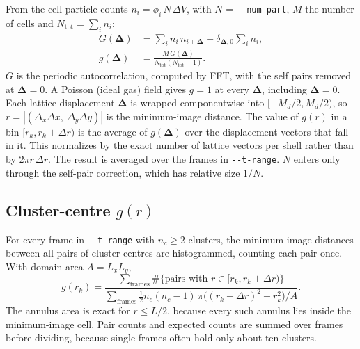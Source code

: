 \documentclass[11pt]{article}
\newcommand{\code}[1]{\texttt{#1}}
\begin{document}
From the cell particle counts $n_i = \phi_i\,N\,\Delta V$, with
$N$ = \code{-{}-num-part}, $M$ the number of cells and $N_{\mathrm{tot}} = \sum_i n_i$:
\begin{align}
  G(\boldsymbol{\Delta}) &= \sum_i n_i\,n_{i+\boldsymbol{\Delta}}
     - \delta_{\boldsymbol{\Delta},0}\sum_i n_i , \\
  g(\boldsymbol{\Delta}) &= \frac{M\,G(\boldsymbol{\Delta})}{N_{\mathrm{tot}}(N_{\mathrm{tot}}-1)} .
\end{align}
$G$ is the periodic autocorrelation, computed by FFT, with the self pairs
removed at $\boldsymbol{\Delta}=0$. A Poisson (ideal gas) field gives
$g = 1$ at every $\boldsymbol{\Delta}$, including $\boldsymbol{\Delta}=0$. Each
lattice displacement $\boldsymbol{\Delta}$ is wrapped componentwise into
$[-M_d/2, M_d/2)$, so $r = |(\Delta_x\Delta x,\ \Delta_y\Delta y)|$ is the
minimum-image distance. The value of $g(r)$ in a bin $[r_k, r_k+\Delta r)$ is
the average of $g(\boldsymbol{\Delta})$ over the displacement vectors that fall
in it. This normalizes by the exact number of lattice vectors per shell rather
than by $2\pi r\,\Delta r$. The result is averaged over the frames in
\code{-{}-t-range}. $N$ enters only through the self-pair correction, which has
relative size $1/N$.

\subsection{\texorpdfstring{Cluster-centre $g(r)$}{Cluster-centre g(r)}}

For every frame in \code{-{}-t-range} with $n_c\ge 2$ clusters, the minimum-image
distances between all pairs of cluster centres are histogrammed, counting each
pair once. With domain area $A = L_xL_y$,
\begin{equation}
  g(r_k) = \frac{\sum_{\text{frames}} \#\{\text{pairs with } r\in[r_k, r_k+\Delta r)\}}
                {\sum_{\text{frames}} \tfrac12 n_c(n_c-1)\,\pi\bigl((r_k+\Delta r)^2 - r_k^2\bigr)/A} .
\end{equation}
The annulus area is exact for $r \le L/2$, because every such annulus lies
inside the minimum-image cell. Pair counts and expected counts are summed over
frames before dividing, because single frames often hold only about ten
clusters.
\end{document}
